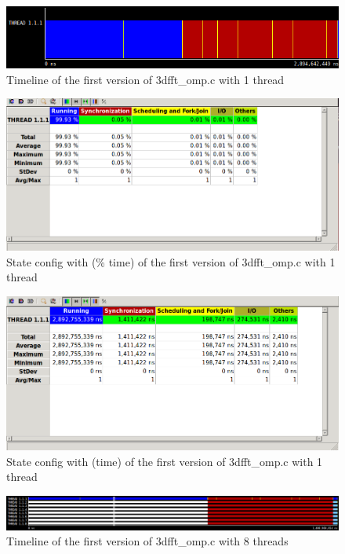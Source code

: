 \documentclass[12]{article}
\begin{document}
\bigskip

\begin{figure}[H]
\centering  
\includegraphics[scale=0.5]{images/3dfft/1threadTimeline.PNG}
    \caption{Timeline of the first version of 3dfft\_omp.c with 1 thread}
\end{figure}

\begin{figure}[H]
\centering  
\includegraphics[scale=0.5]{images/3dfft/1threadPercentage.PNG}
    \caption{State config with (\% time) of the first version of 3dfft\_omp.c with 1 thread}
\end{figure}

\begin{figure}[H]
\centering  
\includegraphics[scale=0.5]{images/3dfft/1thread.PNG}
    \caption{State config with (time) of the first version of 3dfft\_omp.c with 1 thread}
\end{figure}
    

\begin{figure}[H]
\centering  
\includegraphics[scale=0.5]{images/3dfft/8threadsTimeline.PNG}
    \caption{Timeline of the first version of 3dfft\_omp.c with 8 threads}
\end{figure}
    
\end{document}
